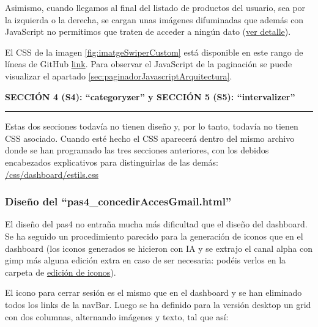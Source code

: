 \documentclass[a4paper,12pt]{report}
\begin{document}
	Asimismo, cuando llegamos al final del listado de productos del usuario, sea por la izquierda o la derecha, se cargan unas imágenes difuminadas que además con JavaScript no permitimos que traten de acceder a ningún dato (\href{https://github.com/blackcub3s/mercApp/blob/main/APP%20WEB/__frontend__produccio__/app/img/dashboard/paginadorEsqDifuminat.png}{ver detalle}).
	
	El CSS de la imagen \ref{fig:imatgeSwiperCustom} está disponible en este rango de líneas de GitHub \href{https://github.com/blackcub3s/mercApp/blob/4ddc34194763af7a246ffabb14146ad9b4b2c5db/APP%20WEB/__frontend__produccio__/app/css/dashboard/estils.css#L155}{link}. Para observar el JavaScript de la paginación se puede visualizar el apartado \ref{sec:paginadorJavascriptArquitectura}.
	
	
	
	
	\noindent \textbf{SECCIÓN 4 (S4): ``categoryzer'' y SECCIÓN 5 (S5): ``intervalizer''}
	\hrule
	\vspace{.5em}
	
	Estas dos secciones todavía no tienen diseño y, por lo tanto, todavía no tienen CSS asociado. Cuando esté hecho el CSS aparecerá dentro del mismo archivo donde se han programado las tres secciones anteriores, con los debidos encabezados explicativos para distinguirlas de las demás: \href{https://github.com/blackcub3s/mercApp/blob/4ddc34194763af7a246ffabb14146ad9b4b2c5db/APP%20WEB/__frontend__produccio__/app/css/dashboard/estils.css}{/css/dashboard/estils.css}
	
	
	\subsubsection{Diseño del ``pas4\_concedirAccesGmail.html''}
	\label{sec:dissenyHtmlCSSpas4}
	
	El diseño del pas4 no entraña mucha más dificultad que el diseño del dashboard. Se ha seguido un procedimiento parecido para la generación de iconos que en el dashboard (los iconos generados se hicieron con IA y se extrajo el canal alpha con gimp más alguna edición extra en caso de ser necesaria: podéis verlos en la carpeta de \href{https://github.com/blackcub3s/mercApp/tree/main/creacioIconos/iconosPas4}{edición de iconos}).
	
	El icono para cerrar sesión es el mismo que en el dashboard y se han eliminado todos los links de la navBar. Luego se ha definido para la versión desktop un grid con dos columnas, alternando imágenes y texto, tal que así:
	
\end{document}
